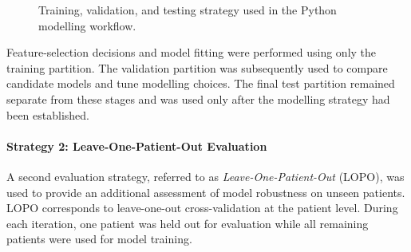 \begin{figure}[H]
    \centering


    \caption{Training, validation, and testing strategy used in the Python
    modelling workflow.}
    \label{fig:partition-workflow}
\end{figure}

Feature-selection decisions and model fitting were performed using only the
training partition. The validation partition was subsequently used to compare
candidate models and tune modelling choices. The final test partition remained
separate from these stages and was used only after the modelling strategy had
been established.

\paragraph{Strategy 2: Leave-One-Patient-Out Evaluation}

A second evaluation strategy, referred to as
\textit{Leave-One-Patient-Out} (LOPO), was used to provide an additional
assessment of model robustness on unseen patients. LOPO corresponds to
leave-one-out cross-validation at the patient level. During each iteration, one
patient was held out for evaluation while all remaining patients were used for
model training.

